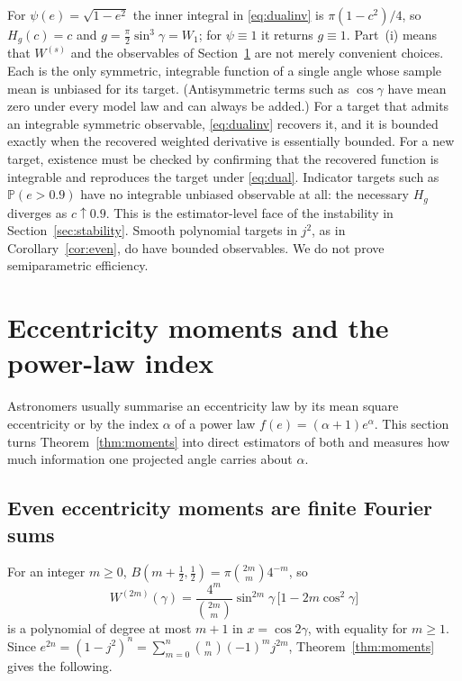 \documentclass[11pt,a4paper]{article}
\theoremstyle{remark}\newtheorem{remark}[theorem]{Remark}
\newcommand{\Prob}{\mathbb P}
\begin{document}
For $\psi(e)=\sqrt{1-e^2}$ the inner integral in \eqref{eq:dualinv} is $\pi(1-c^2)/4$, so $H_g(c)=c$ and $g=\tfrac\pi2\sin^3\gamma=W_1$; for $\psi\equiv1$ it returns $g\equiv1$. Part~(i) means that $W^{(s)}$ and the observables of Section~\ref{sec:ecc} are not merely convenient choices. Each is the only symmetric, integrable function of a single angle whose sample mean is unbiased for its target. (Antisymmetric terms such as $\cos\gamma$ have mean zero under every model law and can always be added.) For a target that admits an integrable symmetric observable, \eqref{eq:dualinv} recovers it, and it is bounded exactly when the recovered weighted derivative is essentially bounded. For a new target, existence must be checked by confirming that the recovered function is integrable and reproduces the target under \eqref{eq:dual}. Indicator targets such as $\Prob(e>0.9)$ have no integrable unbiased observable at all: the necessary $H_g$ diverges as $c\uparrow0.9$. This is the estimator-level face of the instability in Section~\ref{sec:stability}. Smooth polynomial targets in $j^2$, as in Corollary~\ref{cor:even}, do have bounded observables. We do not prove semiparametric efficiency.

\section{Eccentricity moments and the power-law index}\label{sec:ecc}

Astronomers usually summarise an eccentricity law by its mean square eccentricity or by the index $\alpha$ of a power law $f(e)=(\alpha+1)e^\alpha$. This section turns Theorem~\ref{thm:moments} into direct estimators of both and measures how much information one projected angle carries about $\alpha$.

\subsection{Even eccentricity moments are finite Fourier sums}

For an integer $m\ge0$, $B(m+\tfrac12,\tfrac12)=\pi\binom{2m}{m}4^{-m}$, so
\begin{equation}
W^{(2m)}(\gamma)=\frac{4^m}{\binom{2m}{m}}\sin^{2m}\gamma\,\big[1-2m\cos^2\gamma\big]
\end{equation}
is a polynomial of degree at most $m+1$ in $x=\cos2\gamma$, with equality for $m\ge1$. Since $e^{2n}=(1-j^2)^n=\sum_{m=0}^n\binom nm(-1)^mj^{2m}$, Theorem~\ref{thm:moments} gives the following.
\end{document}
